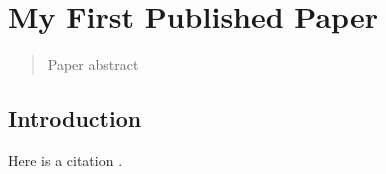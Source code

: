 \chapter{My First Published Paper}

\begin{quote}
Paper abstract
\end{quote}


\section{Introduction}
Here is a citation .



